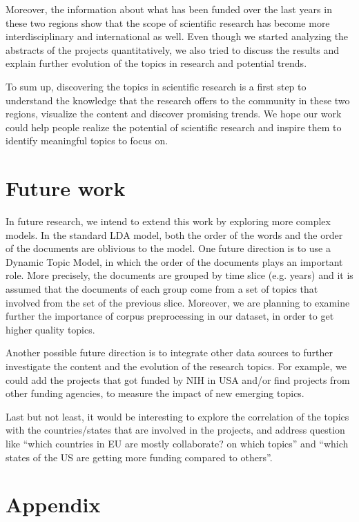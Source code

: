 \documentclass[12pt]{report}
\begin{document}
Moreover, the information about what has been funded over the last years in
these two regions show that the scope of scientific research has become more
interdisciplinary and international as well. Even though we started analyzing
the abstracts of the projects quantitatively, we also tried to discuss the
results and explain further evolution of the topics in research and potential
trends.

To sum up, discovering the topics in scientific research is a first step to
understand the knowledge that the research offers to the community in these two
regions, visualize the content and discover promising trends. We hope our work
could help people realize the potential of scientific research and inspire them
to identify meaningful topics to focus on.

\section{Future work}
\label{future}
In future research, we intend to extend this work by exploring more complex
models. In the standard LDA model, both the order of the words and the order of
the documents are oblivious to the model. One future direction is to use a
Dynamic Topic Model\cite{Blei:2006:DTM:1143844.1143859}, in which the order of
the documents plays an important role. More precisely, the documents are grouped
by time slice (e.g. years) and it is assumed that the documents of each group
come from a set of topics that involved from the set of the previous slice.
Moreover, we are planning to examine further the importance of corpus
preprocessing in our dataset, in order to get higher quality topics.

Another possible future direction is to integrate other data sources to further
investigate the content and the evolution of the research topics. For example,
we could add the projects that got funded by NIH in USA and/or find projects
from other funding agencies, to measure the impact of new emerging topics.

Last but not least, it would be interesting to explore the correlation
of the topics with the countries/states that are involved in the
projects, and address question like ``which countries in EU are mostly
collaborate? on which topics'' and ``which states of the US are getting
more funding compared to others''.

{}


\clearpage
\section{Appendix}
\end{document}

